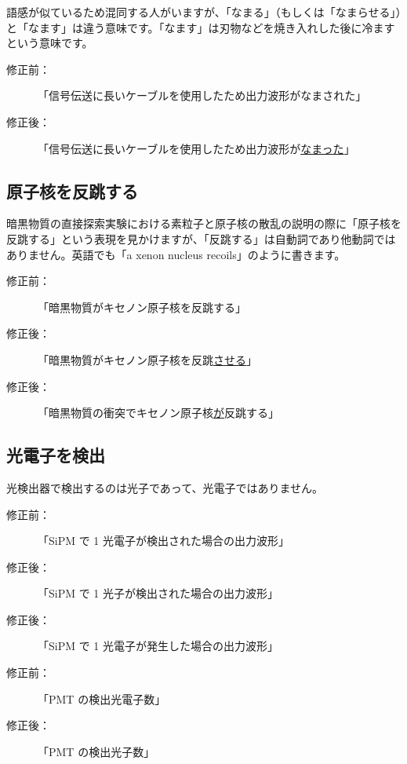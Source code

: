 語感が似ているため混同する人がいますが、「なまる」（もしくは「なまらせる」）と「なます」は違う意味です。「なます」は刃物などを焼き入れした後に冷ますという意味です。

\begin{description}
\item[修正前：]「信号伝送に長いケーブルを使用したため出力波形がなまされた」
\item[修正後：]「信号伝送に長いケーブルを使用したため出力波形が\underline{なまった}」
\end{description}

\subsection{原子核を反跳する}

暗黒物質の直接探索実験における素粒子と原子核の散乱の説明の際に「原子核を反跳する」という表現を見かけますが、「反跳する」は自動詞であり他動詞ではありません。英語でも「a xenon nucleus recoils」のように書きます。

\begin{description}
\item[修正前：]「暗黒物質がキセノン原子核を反跳する」
\item[修正後：]「暗黒物質がキセノン原子核を反跳\underline{させる}」
\item[修正後：]「暗黒物質の衝突でキセノン原子核\underline{が}反跳する」
\end{description}

\subsection{光電子を検出}

光検出器で検出するのは光子であって、光電子ではありません。

\begin{description}
\item[修正前：]「SiPM で 1 光電子が検出された場合の出力波形」
\item[修正後：]「SiPM で 1 光子が検出された場合の出力波形」
\item[修正後：]「SiPM で 1 光電子が発生した場合の出力波形」
\end{description}

\begin{description}
\item[修正前：]「PMT の検出光電子数」
\item[修正後：]「PMT の検出光子数」
\end{description}


